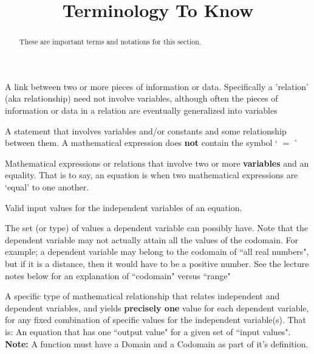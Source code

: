 \documentclass{ximeraXloud}
\title{Terminology To Know}
\begin{document}
\begin{abstract}
    These are important terms and notations for this section.
\end{abstract}
\maketitle

\begin{definition}
    A link between two or more pieces of information or data. Specifically a 'relation' (aka relationship) need not involve variables, although often the pieces of information or data in a relation are eventually generalized into variables
\end{definition}
    
\begin{definition}
    A statement that involves variables and/or constants and some relationship between them. A mathematical expression does \textbf{not} contain the symbol ` $=$ '
\end{definition}

\begin{definition}[Equation]
Mathematical expressions or relations that involve two or more \textbf{variables} and an equality. That is to say, an equation is when two mathematical expressions are `equal' to one another.
\end{definition}

\begin{definition}[Domain]
    Valid input values for the independent variables of an equation.
\end{definition}

\begin{definition}[Codomain]
    The set (or type) of values a dependent variable can possibly have. Note that the dependent variable may not actually attain all the values of the codomain.
    For example; a dependent variable may belong to the codomain of ``all real numbers", but if it is a distance, then it would have to be a positive number. See the lecture notes below for an explanation of ``codomain" versus ``range"
\end{definition}

\begin{definition}[Function]
    A specific type of mathematical relationship that relates independent and dependent variables, and yields \textbf{precisely one} value for each dependent variable, for any fixed combination of specific values for the independent variable(s). That is: An equation that has one ``output value" for a given set of ``input values".
    \textbf{Note:} A function must have a Domain and a Codomain as part of it's definition.
\end{definition}
\end{document}
